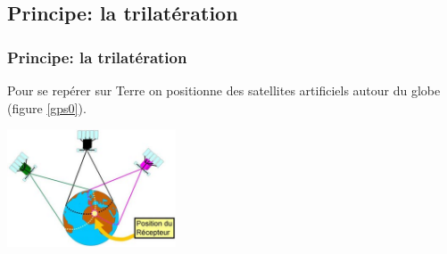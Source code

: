 \documentclass[svgnames,11pt]{beamer}
\begin{document}
\subsection{Principe: la trilatération}
\begin{frame}
    \frametitle{Principe: la trilatération}

    Pour se repérer sur Terre on positionne des satellites artificiels autour du globe (figure \ref{gps0}).
    \begin{center}
        \centering
        \includegraphics[width=5cm]{ressources/gps0.jpg}
        \label{gps0}
    \end{center}

\end{frame}
\end{document}
